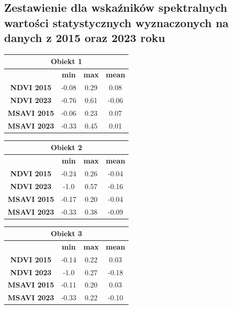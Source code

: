 \documentclass[a4paper,12pt]{article}  %
\begin{document}
\newpage
\subsection{Zestawienie dla wskaźników spektralnych wartości statystycznych wyznaczonych na danych z 2015 oraz 2023 roku}

\begin{table}[h!]
    \centering
    \begin{tabular}{|c|c|c|c|}
    \hline
    \multicolumn{4}{|c|}{\textbf{Obiekt 1}} \\ \hline
    \textbf{} & \textbf{min} & \textbf{max} & \textbf{mean} \\ \hline
    \textbf{NDVI 2015} & -0.08 & 0.29 & 0.08\\ \hline
    \textbf{NDVI 2023} & -0.76 & 0.61 & -0.06\\ \hline
    \textbf{MSAVI 2015} & -0.06 & 0.23 & 0.07\\ \hline
    \textbf{MSAVI 2023} & -0.33 & 0.45 & 0.01\\ \hline
    \end{tabular}
\end{table}

\begin{table}[h!]
    \centering
    \begin{tabular}{|c|c|c|c|}
    \hline
    \multicolumn{4}{|c|}{\textbf{Obiekt 2}} \\ \hline
    \textbf{} & \textbf{min} & \textbf{max} & \textbf{mean} \\ \hline
    \textbf{NDVI 2015} & -0.24 & 0.26 & -0.04\\ \hline
    \textbf{NDVI 2023} & -1.0 & 0.57 & -0.16\\ \hline
    \textbf{MSAVI 2015} & -0.17 & 0.20 & -0.04\\ \hline
    \textbf{MSAVI 2023} & -0.33 & 0.38 & -0.09\\ \hline
    \end{tabular}
\end{table}

\begin{table}[h!]
    \centering
    \begin{tabular}{|c|c|c|c|}
    \hline
    \multicolumn{4}{|c|}{\textbf{Obiekt 3}} \\ \hline
    \textbf{} & \textbf{min} & \textbf{max} & \textbf{mean} \\ \hline
    \textbf{NDVI 2015} & -0.14 & 0.22 & 0.03\\ \hline
    \textbf{NDVI 2023} & -1.0 & 0.27 & -0.18\\ \hline
    \textbf{MSAVI 2015} & -0.11 & 0.20 & 0.03\\ \hline
    \textbf{MSAVI 2023} & -0.33 & 0.22 & -0.10\\ \hline
    \end{tabular}
\end{table}
\end{document}
